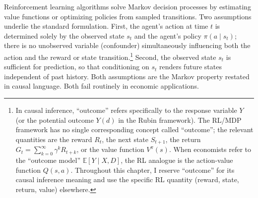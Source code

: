 %

Reinforcement learning algorithms solve Markov decision processes by estimating value functions or optimizing policies from sampled transitions. Two assumptions underlie the standard formulation. First, the agent's action at time $t$ is determined solely by the observed state $s_t$ and the agent's policy $\pi(a \mid s_t)$; there is no unobserved variable (confounder) simultaneously influencing both the action and the reward or state transition.\footnote{In causal inference, ``outcome'' refers specifically to the response variable $Y$ (or the potential outcome $Y(d)$ in the Rubin framework). The RL/MDP framework has no single corresponding concept called ``outcome''; the relevant quantities are the reward $R_t$, the next state $S_{t+1}$, the return $G_t = \sum_{k=0}^\infty \gamma^k R_{t+k}$, or the value function $V^\pi(s)$. When economists refer to the ``outcome model'' $\mathbb{E}[Y \mid X, D]$, the RL analogue is the action-value function $Q(s,a)$. Throughout this chapter, I reserve ``outcome'' for its causal inference meaning and use the specific RL quantity (reward, state, return, value) elsewhere.}
Second, the observed state $s_t$ is sufficient for prediction, so that conditioning on $s_t$ renders future states independent of past history. Both assumptions are the Markov property restated in causal language. Both fail routinely in economic applications.

